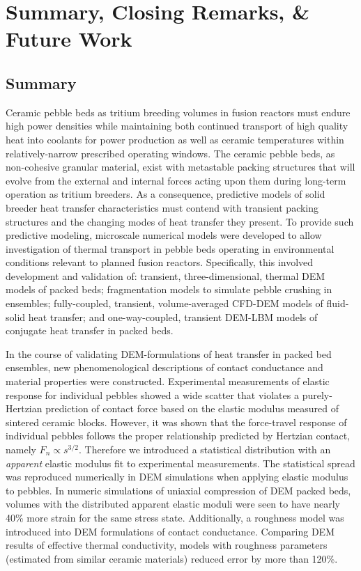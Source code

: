 \chapter{Summary, Closing Remarks, \& Future Work}\label{sec:summary}

\section{Summary}

Ceramic pebble beds as tritium breeding volumes in fusion reactors must endure high power densities while maintaining both continued transport of high quality heat into coolants for power production as well as ceramic temperatures within relatively-narrow prescribed operating windows. The ceramic pebble beds, as non-cohesive granular material, exist with metastable packing structures that will evolve from the external and internal forces acting upon them during long-term operation as tritium breeders. As a consequence, predictive models of solid breeder heat transfer characteristics must contend with transient packing structures and the changing modes of heat transfer they present. To provide such predictive modeling, microscale numerical models were developed to allow investigation of thermal transport in pebble beds operating in environmental conditions relevant to planned fusion reactors. Specifically, this involved development and validation of: transient, three-dimensional, thermal DEM models of packed beds; fragmentation models to simulate pebble crushing in ensembles; fully-coupled, transient, volume-averaged CFD-DEM models of fluid-solid heat transfer; and one-way-coupled, transient DEM-LBM models of conjugate heat transfer in packed beds. %

In the course of validating DEM-formulations of heat transfer in packed bed ensembles, new phenomenological descriptions of contact conductance and material properties were constructed. Experimental measurements of elastic response for individual pebbles showed a wide scatter that violates a purely-Hertzian prediction of contact force based on the elastic modulus measured of sintered ceramic blocks. However, it was shown that the force-travel response of individual pebbles follows the proper relationship predicted by Hertzian contact, namely $F_n \propto s^{3/2}$. Therefore we introduced a statistical distribution with an \textit{apparent} elastic modulus fit to experimental measurements. The statistical spread was reproduced numerically in DEM simulations when applying elastic modulus to pebbles. In numeric simulations of uniaxial compression of DEM packed beds, volumes with the distributed apparent elastic moduli were seen to have nearly 40\% more strain for the same stress state. Additionally, a roughness model was introduced into DEM formulations of contact conductance. Comparing DEM results of effective thermal conductivity, models with roughness parameters (estimated from similar ceramic materials) reduced error by more than 120\%. 

